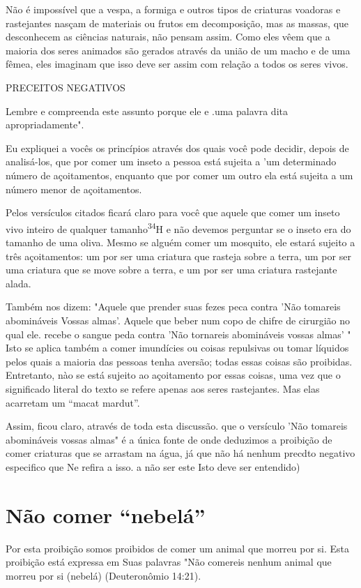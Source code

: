 Não é impossível que a vespa, a formiga e outros tipos de criaturas
voadoras e rastejantes nasçam de materiais ou frutos em decomposição,
mas as massas, que desconhecem as ciências naturais, não pensam assim.
Como eles vêem que a maioria dos seres animados são gerados através da
união de um macho e de uma fêmea, eles imaginam que isso deve ser assim
com relação a todos os seres vivos.

PRECEITOS NEGATIVOS

Lembre e compreenda este assunto porque ele e .uma
palavra dita apropriadamente".

Eu expliquei a vocês os princípios através dos quais você pode deci­dir,
depois de analisá-los, que por comer um inseto a pessoa está sujeita a
'um determinado número de açoitamentos, enquanto que por comer um outro
ela está sujeita a um número menor de açoitamentos.

Pelos versículos citados ficará claro para você que aquele que co­mer um
inseto vivo inteiro de qualquer tamanho\textsuperscript{34}H e não
devemos perguntar se o inseto era do tamanho de uma oliva. Mesmo se
alguém comer um mosqui­to, ele estará sujeito a três açoitamentos: um
por ser uma criatura que rasteja sobre a terra, um por ser uma criatura
que se move sobre a terra, e um por ser uma criatura rastejante alada.

Também nos dizem: "Aquele que prender suas fezes peca contra 'Não
tomareis abomináveis Vossas almas'. Aquele que beber num copo de chifre
de cirurgião no qual ele. recebe o sangue peda contra 'Não tornareis
abomináveis vossas almas' " Isto se aplica também a comer imundícies ou
coisas repulsivas ou tomar líquidos pelos quais a maioria das pessoas
tenha aversão; todas essas coisas são proibidas. Entretanto, nào se está
sujeito ao açoitamento por essas coisas, uma vez que o significado
literal do texto se refere apenas aos seres ras­tejantes. Mas elas
acarretam um ``macat mardut''.

Assim, ficou claro, através de toda esta discussão. que o versículo 'Não
tomareis abomináveis vossas almas" é a única fonte de onde deduzimos a
proibição de comer criaturas que se arrastam na água, já que não há
nenhum precdto negativo especifico que Ne refira a isso. a não ser este
Isto deve ser entendido)

\section{Não comer ``nebelá''}

Por esta proibição somos proibidos de comer um animal que mor­reu por
si. Esta proibição está expressa em Suas palavras "Não comereis ne­nhum
animal que morreu por si (nebelá) (Deuteronômio 14:21).

